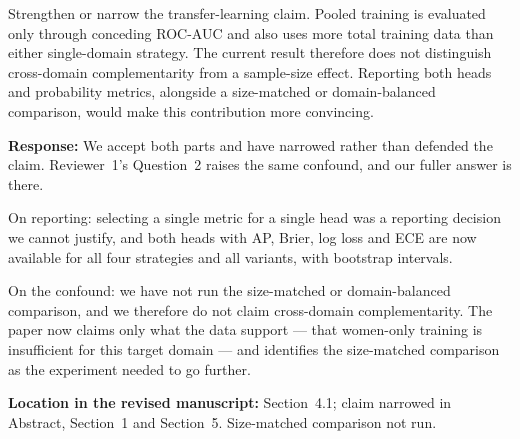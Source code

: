 \documentclass[11pt,a4paper]{article}
\newcommand{\response}[2]{%
  \begin{responsebox}
  \textbf{Response:}
  #1
  \end{responsebox}
  \begin{locationbox}
  \textbf{Location in the revised manuscript:}
  #2
  \end{locationbox}
}
\begin{document}
\begin{reviewbox}
Strengthen or narrow the transfer-learning claim. Pooled training is evaluated only through conceding ROC-AUC and also uses more total training data than either single-domain strategy. The current result therefore does not distinguish cross-domain complementarity from a sample-size effect. Reporting both heads and probability metrics, alongside a size-matched or domain-balanced comparison, would make this contribution more convincing.
\end{reviewbox}
\response{We accept both parts and have narrowed rather than defended the claim. Reviewer~1's Question~2 raises the same confound, and our fuller answer is there.

On reporting: selecting a single metric for a single head was a reporting decision we cannot justify, and both heads with AP, Brier, log loss and ECE are now available for all four strategies and all variants, with bootstrap intervals.

On the confound: we have not run the size-matched or domain-balanced comparison, and we therefore do not claim cross-domain complementarity. The paper now claims only what the data support --- that women-only training is insufficient for this target domain --- and identifies the size-matched comparison as the experiment needed to go further.}{Section~4.1; claim narrowed in Abstract, Section~1 and Section~5. Size-matched comparison not run.}
\end{document}
